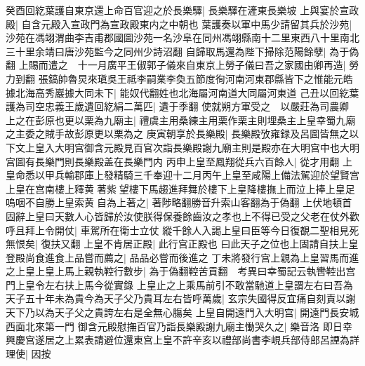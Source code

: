 癸酉回紇葉護自東京還上命百官迎之於長樂驛|{
	長樂驛在滻東長樂坡}
上與宴於宣政殿|{
	自含元殿入宣政門為宣政殿東内之中朝也}
葉護奏以軍中馬少請留其兵於沙苑|{
	沙苑在馮翊渭曲李吉甫郡國圖沙苑一名沙阜在同州馮翊縣南十二里東西八十里南北三十里余靖曰唐沙苑監今之同州少詩沼翻}
自歸取馬還為陛下掃除范陽餘孽|{
	為于偽翻}
上賜而遣之　十一月廣平王俶郭子儀來自東京上勞子儀曰吾之家國由卿再造|{
	勞力到翻}
張鎬帥魯炅來瑱吳王祗李嗣業李奐五節度徇河南河東郡縣皆下之惟能元皓據北海高秀巖據大同未下|{
	能奴代翻姓也北海屬河南道大同屬河東道}
己丑以回紇葉護為司空忠義王歲遺回紇絹二萬匹|{
	遺于季翻}
使就朔方軍受之　以嚴莊為司農卿　上之在彭原也更以栗為九廟主|{
	禮虞主用桑練主用栗作栗主則埋桑主上皇幸蜀九廟之主委之賊手故彭原更以栗為之}
庚寅朝享於長樂殿|{
	長樂殿攷雍録及呂圖皆無之以下文上皇入大明宫御含元殿見百官次詣長樂殿謝九廟主則是殿亦在大明宫中也大明宫圖有長樂門則長樂殿盖在長樂門内}
丙申上皇至鳳翔從兵六百餘人|{
	從才用翻}
上皇命悉以甲兵輸郡庫上發精騎三千奉迎十二月丙午上皇至咸陽上備法駕迎於望賢宫上皇在宫南樓上釋黄著紫望樓下馬趨進拜舞於樓下上皇降樓撫上而泣上捧上皇足嗚咽不自勝上皇索黄自為上著之|{
	著陟略翻勝音升索山客翻為于偽翻}
上伏地頓首固辭上皇曰天數人心皆歸於汝使朕得保養餘齒汝之孝也上不得已受之父老在仗外歡呼且拜上令開仗|{
	車駕所在衛士立仗}
縱千餘人入謁上皇曰臣等今日復覩二聖相見死無恨矣|{
	復扶又翻}
上皇不肯居正殿|{
	此行宫正殿也}
曰此天子之位也上固請自扶上皇登殿尚食進食上品嘗而薦之|{
	品品必嘗而後進之}
丁未將發行宫上親為上皇習馬而進之上皇上皇上馬上親執鞚行數步|{
	為于偽翻鞚苦貢翻　考異曰幸蜀記云執轡鞚出宫門上皇令左右扶上馬今從實錄}
上皇止之上乘馬前引不敢當馳道上皇謂左右曰吾為天子五十年未為貴今為天子父乃貴耳左右皆呼萬歲|{
	玄宗失國得反宜痛自刻責以謝天下乃以為天子父之貴誇左右是全無心膓矣}
上皇自開遠門入大明宫|{
	開遠門長安城西面北來第一門}
御含元殿慰撫百官乃詣長樂殿謝九廟主慟哭久之|{
	樂音洛}
即日幸興慶宫遂居之上累表請避位還東宫上皇不許辛亥以禮部尚書李峴兵部侍郎呂諲為詳理使|{
	因按}


